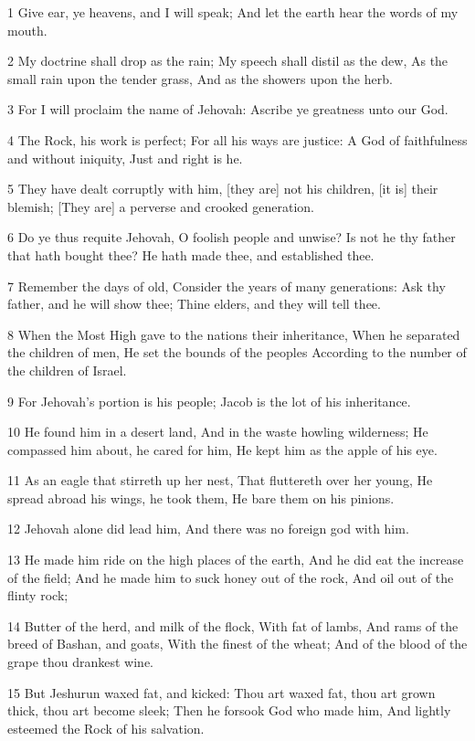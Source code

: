 \par 1 Give ear, ye heavens, and I will speak; And let the earth hear the words of my mouth.
\par 2 My doctrine shall drop as the rain; My speech shall distil as the dew, As the small rain upon the tender grass, And as the showers upon the herb.
\par 3 For I will proclaim the name of Jehovah: Ascribe ye greatness unto our God.
\par 4 The Rock, his work is perfect; For all his ways are justice: A God of faithfulness and without iniquity, Just and right is he.
\par 5 They have dealt corruptly with him, [they are] not his children, [it is] their blemish; [They are] a perverse and crooked generation.
\par 6 Do ye thus requite Jehovah, O foolish people and unwise? Is not he thy father that hath bought thee? He hath made thee, and established thee.
\par 7 Remember the days of old, Consider the years of many generations: Ask thy father, and he will show thee; Thine elders, and they will tell thee.
\par 8 When the Most High gave to the nations their inheritance, When he separated the children of men, He set the bounds of the peoples According to the number of the children of Israel.
\par 9 For Jehovah's portion is his people; Jacob is the lot of his inheritance.
\par 10 He found him in a desert land, And in the waste howling wilderness; He compassed him about, he cared for him, He kept him as the apple of his eye.
\par 11 As an eagle that stirreth up her nest, That fluttereth over her young, He spread abroad his wings, he took them, He bare them on his pinions.
\par 12 Jehovah alone did lead him, And there was no foreign god with him.
\par 13 He made him ride on the high places of the earth, And he did eat the increase of the field; And he made him to suck honey out of the rock, And oil out of the flinty rock;
\par 14 Butter of the herd, and milk of the flock, With fat of lambs, And rams of the breed of Bashan, and goats, With the finest of the wheat; And of the blood of the grape thou drankest wine.
\par 15 But Jeshurun waxed fat, and kicked: Thou art waxed fat, thou art grown thick, thou art become sleek; Then he forsook God who made him, And lightly esteemed the Rock of his salvation.
